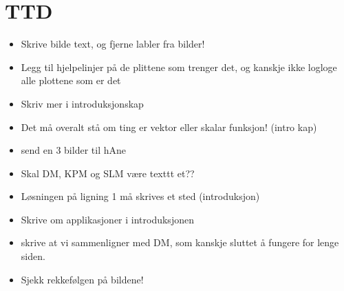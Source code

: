 \chapter{TTD}
\begin{itemize}
\item Skrive bilde text, og fjerne labler fra bilder!
\item Legg til hjelpelinjer på de plittene som trenger det, og kanskje ikke logloge alle plottene som er det
\item Skriv mer i introduksjonskap
\item Det må overalt stå om ting er vektor eller skalar funksjon! (intro kap)
\item send en 3 bilder til hAne
\item Skal DM, KPM og SLM være texttt et??
\item Løsningen på ligning 1 må skrives et sted (introduksjon)
\item Skrive om applikasjoner i introduksjonen
\item skrive at vi sammenligner med DM, som kanskje sluttet å fungere for lenge siden.
\item Sjekk rekkefølgen på bildene!

\end{itemize}
